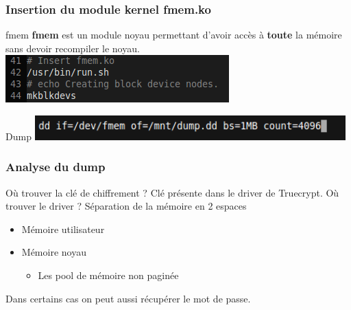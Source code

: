 \documentclass[red]{beamer}
\begin{document}
\begin{frame}
    \frametitle{Insertion du module kernel fmem.ko}
    \begin{block}{fmem}
    \textbf{fmem} est un module noyau permettant d'avoir accès à \textbf{toute} la mémoire
    sans devoir recompiler le noyau.
    ~~ \\
    \centering
        \includegraphics[height=0.2\textheight]{img/init.png}
    \end{block}
    
    \begin{block}{Dump}
   \centering
        \includegraphics[width=0.9\textwidth]{img/dd.png}
    \end{block}
    
\end{frame}

\begin{frame}
    \frametitle{Analyse du dump}
    \begin{block}{Où trouver la clé de chiffrement ?}
    Clé présente dans le driver de Truecrypt.
    Où trouver le driver ?
    Séparation de la mémoire en 2 espaces
    \begin{itemize}
        \item Mémoire utilisateur
        \item Mémoire noyau 
        \begin{itemize}
        \item Les pool de mémoire non paginée
        \end{itemize}
    \end{itemize}

    \end{block}
    
    Dans certains cas on peut aussi récupérer le mot de passe.
\end{frame}




\end{document}

